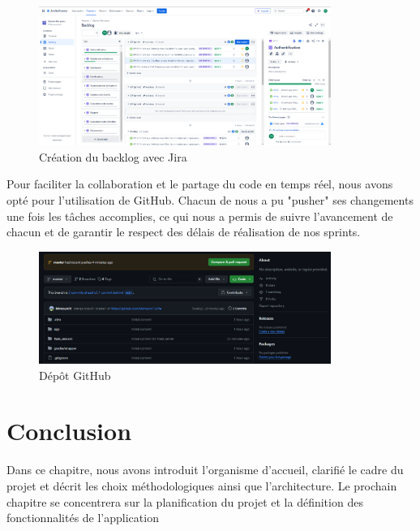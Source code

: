 \begin{figure}[ht]
    \centering
    \includegraphics[width=0.85\textwidth]{chap1.images/jira.png}
    \caption{Création du backlog avec Jira}
\end{figure}

Pour faciliter la collaboration et le partage du code en temps réel, nous avons opté pour l'utilisation de GitHub. Chacun de nous a pu "pusher" ses changements une fois les tâches accomplies, ce qui nous a permis de suivre l'avancement de chacun et de garantir le respect des délais de réalisation de nos sprints. \\
\begin{figure}[ht]
    \centering
    \includegraphics[width=0.85\textwidth]{chap1.images/depot git.png}

    \caption{Dépôt GitHub}
\end{figure}




\newpage
\section*{Conclusion}
\bigskip
\begin{sloppypar}
    Dans ce chapitre, nous avons introduit l’organisme d’accueil, clarifié le cadre du projet  et décrit les choix méthodologiques ainsi que l’architecture. Le prochain chapitre se concentrera sur la planification du projet et la définition des fonctionnalités de l’application
\end{sloppypar}








